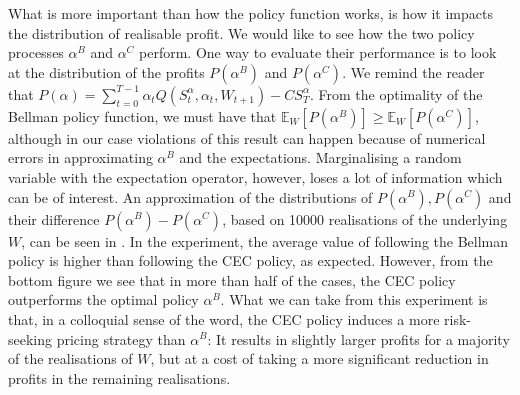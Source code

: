 \documentclass[main.tex]{subfiles}
\begin{document}
What is more important than how the policy function works, is how it
impacts the distribution of realisable profit. We would like to
see how the two policy processes $\alpha^B$ and $\alpha^C$ perform.
One way to evaluate their performance is to look at
the distribution of the profits $P(\alpha^B)$ and $P(\alpha^C)$.
We remind the reader that
$P(\alpha) =
\sum_{t=0}^{T-1}\alpha_tQ(S_t^\alpha,\alpha_t,W_{t+1})-CS_T^\alpha$.
From the optimality of the Bellman policy function, we must have
that $\mathbb{E}_W[P(\alpha^B)]\geq \mathbb
E_W[P(\alpha^C)]$, although in our case violations of this result can
happen because of
numerical errors in approximating $\alpha^B$ and the expectations.
Marginalising a random variable with the expectation operator, however,
loses a lot of information which can be of interest.
An approximation of the distributions of $P(\alpha^B), P(\alpha^C)$
and their difference
$P(\alpha^B)-P(\alpha^C)$, based on \num{10000} realisations of the
underlying $W$, can be seen in .
In the experiment, the average value of following the
Bellman policy is higher than following the CEC policy, as expected.
However, from the bottom figure we see that
in more than half of the cases, the CEC policy outperforms the optimal
policy $\alpha^B$. What we can take from this experiment is that, in a
colloquial sense of the word,
the CEC policy induces a more risk-seeking pricing strategy than
$\alpha^B$: It results in slightly larger profits for a majority of the
realisations of $W$, but at a cost of taking a more significant
reduction in
profits in the remaining realisations.
\end{document}
